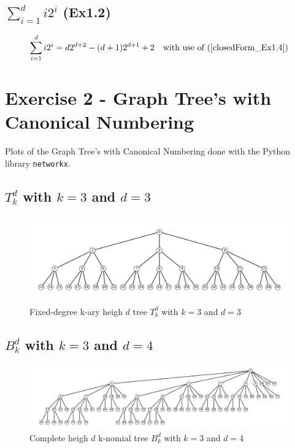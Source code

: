 \subsection{$\sum_{i=1}^d i2^i$ (Ex1.2)}

\begin{equation}
    \begin{aligned}
        \sum_{i=1}^d i2^i = d  2^{d+2} - (d+1)2^{d+1} + 2 \quad \text{with use of (\ref{closedForm_Ex1.4})}
    \end{aligned}
\end{equation}

\pagebreak

\section{Exercise 2 - Graph Tree's with Canonical Numbering}
Plots of the Graph Tree's with Canonical Numbering done with the Python library \texttt{networkx}.
\subsection{$T^d_k$ with $k=3$ and $d=3$}

\begin{figure}[h]
    \begin{center}
        \includegraphics[width=.9\linewidth]{figures/Ex1_2_a.pdf}
        \caption{Fixed-degree k-ary heigh $d$ tree $T^d_k$ with $k=3$ and $d=3$}
    \end{center}
\end{figure}


\subsection{$B^d_k$ with $k=3$ and $d=4$}

\begin{figure}[h]
    \begin{center}
        \includegraphics[width=0.9\linewidth]{figures/Ex1_2_b.pdf}
        \caption{Complete heigh $d$ k-nomial tree $B^d_k$ with $k=3$ and $d=4$}
    \end{center}
\end{figure}

